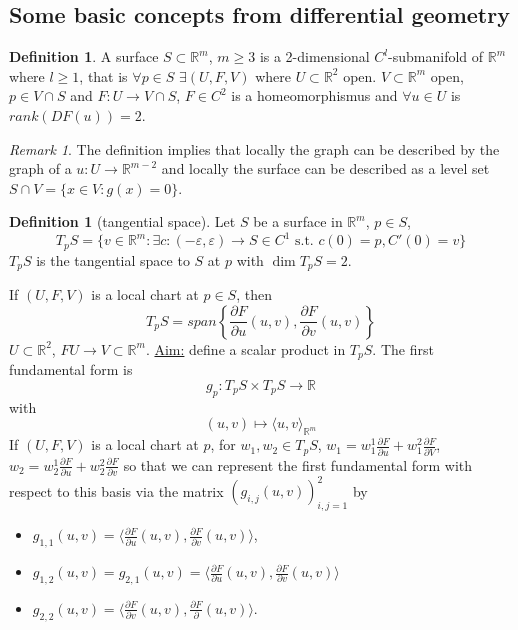 \documentclass[a4paper, 12pt]{article}
\theoremstyle{plain}
\theoremstyle{definition}
\newtheorem{definition}[theorem]{Definition} %
\theoremstyle{lemma}
\theoremstyle{remark}
\newtheorem{remark}[theorem]{Remark}
\theoremstyle{corollary}
\theoremstyle{example}
\begin{document}
	\subsection{Some basic concepts from differential geometry}
	\begin{definition}
		A surface $S \subset \mathbb{R}^m$, $m \geq 3$ is a 2-dimensional $C^l$-submanifold of $\mathbb{R}^m$ where $l\geq 1$, that is $\forall p \in S$ $\exists (U,F,V)$ where $U \subset \mathbb{R}^2$ open. $V\subset \mathbb{R}^m$ open, $p \in V\cap S$ and $F:U \to V\cap S$, $F \in C^2$ is a homeomorphismus and $\forall u \in U$ is $rank(DF(u)) = 2$.
	\end{definition}
	\begin{remark}
		The definition implies that locally the graph can be described by the graph of a $u:U \to \mathbb{R}^{m-2}$ and locally the surface can be described as a level set $S\cap V = \{x \in V: g(x)=0\}$.
	\end{remark}
	\begin{definition}[tangential space]
		Let $S$ be a surface in $\mathbb{R}^m$, $p \in S$, \[T_pS = \{v \in \mathbb{R}^m: \exists c: (-\varepsilon, \varepsilon) \to S \in C^1 \text{ s.t. } c(0)=p, C'(0) = v\}\] $T_pS$ is the tangential space to $S$ at $p$ with $\dim T_pS = 2$.
	\end{definition}
	If $(U,F,V)$ is a local chart at $p \in S$, then \[T_pS = span\left\{\frac{\partial F}{\partial u}(u,v), \frac{\partial F}{\partial v}(u,v)\right\}\] $U \subset \mathbb{R}^2$, $F U \to V \subset \mathbb{R}^m$.
	\underline{Aim:} define a scalar product in $T_pS$. The first fundamental form is \[g_p: T_pS \times T_pS \to \mathbb{R}\] with \[(u,v) \mapsto \langle u,v\rangle_{\mathbb{R}^m}\]
	If $(U,F,V)$ is a local chart at $p$, for $w_1,w_2 \in T_pS$, $w_1 = w_1^1 \frac{\partial F}{\partial u} + w_1^2 \frac{\partial F}{\partial V}$, $w_2 = w_2^1 \frac{\partial F}{\partial u} + w_2^2 \frac{\partial F}{\partial v}$ so that we can represent the first fundamental form with respect to this basis via the matrix $(g_{i,j}(u,v))^2_{i,j=1}$ by 
	\begin{itemize}
		\item $g_{1,1}(u,v) = \langle \frac{\partial F}{\partial u}(u,v), \frac{\partial F}{\partial v}(u,v)\rangle$, 
		\item $g_{1,2}(u,v) = g_{2,1}(u,v) = \langle \frac{\partial F}{\partial u}(u,v), \frac{\partial F}{\partial v}(u,v) \rangle$
		\item $g_{2,2}(u,v) = \langle \frac{\partial F}{\partial v}(u,v), \frac{\partial F}{\partial }(u,v) \rangle$.
	\end{itemize}
\end{document}
